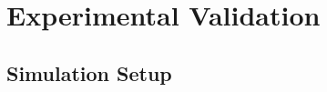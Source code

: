 \documentclass[8pt, aspectratio=169, handout]{beamer}
\begin{document}

\section{Experimental Validation}

\subsection{Simulation Setup}
\end{document}
